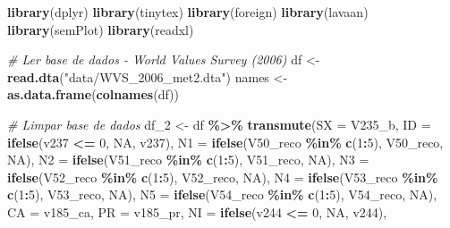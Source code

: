 \documentclass[
  12pt,
]{article}
\newenvironment{Shaded}{\begin{snugshade}}{\end{snugshade}}
\newcommand{\CommentTok}[1]{\textcolor[rgb]{0.56,0.35,0.01}{\textit{#1}}}
\newcommand{\DataTypeTok}[1]{\textcolor[rgb]{0.13,0.29,0.53}{#1}}
\newcommand{\DecValTok}[1]{\textcolor[rgb]{0.00,0.00,0.81}{#1}}
\newcommand{\KeywordTok}[1]{\textcolor[rgb]{0.13,0.29,0.53}{\textbf{#1}}}
\newcommand{\NormalTok}[1]{#1}
\newcommand{\OperatorTok}[1]{\textcolor[rgb]{0.81,0.36,0.00}{\textbf{#1}}}
\newcommand{\OtherTok}[1]{\textcolor[rgb]{0.56,0.35,0.01}{#1}}
\newcommand{\StringTok}[1]{\textcolor[rgb]{0.31,0.60,0.02}{#1}}
\begin{document}
\scriptsize

\begin{Shaded}
\begin{Highlighting}[]
\KeywordTok{library}\NormalTok{(dplyr)}
\KeywordTok{library}\NormalTok{(tinytex)}
\KeywordTok{library}\NormalTok{(foreign)}
\KeywordTok{library}\NormalTok{(lavaan)}
\KeywordTok{library}\NormalTok{(semPlot)}
\KeywordTok{library}\NormalTok{(readxl)}

\CommentTok{\# Ler base de dados {-} World Values Survey (2006)}
\NormalTok{df \textless{}{-}}\StringTok{ }\KeywordTok{read.dta}\NormalTok{(}\StringTok{"data/WVS\_2006\_met2.dta"}\NormalTok{)}
\NormalTok{names \textless{}{-}}\StringTok{ }\KeywordTok{as.data.frame}\NormalTok{(}\KeywordTok{colnames}\NormalTok{(df))}

\CommentTok{\# Limpar base de dados}
\NormalTok{df\_}\DecValTok{2}\NormalTok{ \textless{}{-}}\StringTok{ }\NormalTok{df }\OperatorTok{\%\textgreater{}\%}
\StringTok{  }\KeywordTok{transmute}\NormalTok{(}\DataTypeTok{SX =}\NormalTok{ V235\_b,}
            \DataTypeTok{ID =} \KeywordTok{ifelse}\NormalTok{(v237 }\OperatorTok{\textless{}=}\StringTok{ }\DecValTok{0}\NormalTok{, }\OtherTok{NA}\NormalTok{, v237),}
            \DataTypeTok{N1 =} \KeywordTok{ifelse}\NormalTok{(V50\_reco }\OperatorTok{\%in\%}\StringTok{ }\KeywordTok{c}\NormalTok{(}\DecValTok{1}\OperatorTok{:}\DecValTok{5}\NormalTok{), V50\_reco, }\OtherTok{NA}\NormalTok{),}
            \DataTypeTok{N2 =} \KeywordTok{ifelse}\NormalTok{(V51\_reco }\OperatorTok{\%in\%}\StringTok{ }\KeywordTok{c}\NormalTok{(}\DecValTok{1}\OperatorTok{:}\DecValTok{5}\NormalTok{), V51\_reco, }\OtherTok{NA}\NormalTok{),}
            \DataTypeTok{N3 =} \KeywordTok{ifelse}\NormalTok{(V52\_reco }\OperatorTok{\%in\%}\StringTok{ }\KeywordTok{c}\NormalTok{(}\DecValTok{1}\OperatorTok{:}\DecValTok{5}\NormalTok{), V52\_reco, }\OtherTok{NA}\NormalTok{),}
            \DataTypeTok{N4 =} \KeywordTok{ifelse}\NormalTok{(V53\_reco }\OperatorTok{\%in\%}\StringTok{ }\KeywordTok{c}\NormalTok{(}\DecValTok{1}\OperatorTok{:}\DecValTok{5}\NormalTok{), V53\_reco, }\OtherTok{NA}\NormalTok{),}
            \DataTypeTok{N5 =} \KeywordTok{ifelse}\NormalTok{(V54\_reco }\OperatorTok{\%in\%}\StringTok{ }\KeywordTok{c}\NormalTok{(}\DecValTok{1}\OperatorTok{:}\DecValTok{5}\NormalTok{), V54\_reco, }\OtherTok{NA}\NormalTok{),}
            \DataTypeTok{CA =}\NormalTok{ v185\_ca,}
            \DataTypeTok{PR =}\NormalTok{ v185\_pr,}
            \DataTypeTok{NI =} \KeywordTok{ifelse}\NormalTok{(v244 }\OperatorTok{\textless{}=}\StringTok{ }\DecValTok{0}\NormalTok{, }\OtherTok{NA}\NormalTok{, v244),}

\end{Highlighting}
\end{Shaded}
\end{document}
